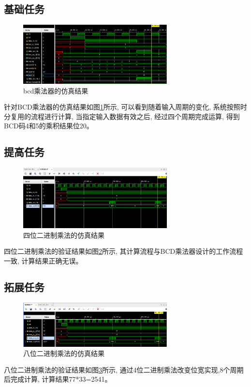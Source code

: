 \documentclass{article}
\begin{document}
\subsection*{基础任务}
\begin{figure}[htbp]
    \centering
    \includegraphics[width=0.7\textwidth]{image/2024-06-20-18-47-58.png}
    \caption{bcd乘法器的仿真结果}
    \label{image_bcd_sim}
\end{figure}
针对BCD乘法器的仿真结果如图\ref{image_bcd_sim}所示, 可以看到随着输入周期的变化, 系统按照时分复用的流程进行计算, 当指定输入数据有效之后, 经过四个周期完成运算, 得到BCD码4和5的乘积结果位20。
\subsection*{提高任务}
\begin{figure}[H]
    \centering
    \includegraphics[width=0.7\textwidth]{image/2024-06-24-11-48-32.png}
    \caption{四位二进制乘法的仿真结果}
    \label{image_4bit_sim}
\end{figure}
四位二进制乘法的验证结果如图\ref{image_4bit_sim}所示, 其计算流程与BCD乘法器设计的工作流程一致, 计算结果正确无误。
\subsection*{拓展任务}
\begin{figure}[H]
    \centering
    \includegraphics[width=0.7\textwidth]{image/2024-06-24-11-33-41.png}
    \caption{八位二进制乘法的仿真结果}
    \label{image_8bit_sim}
\end{figure}
八位二进制乘法的验证结果如图\ref{image_8bit_sim}所示, 通过4位二进制乘法改变位宽实现,8个周期后完成计算, 计算结果77*33=2541。
\end{document}
